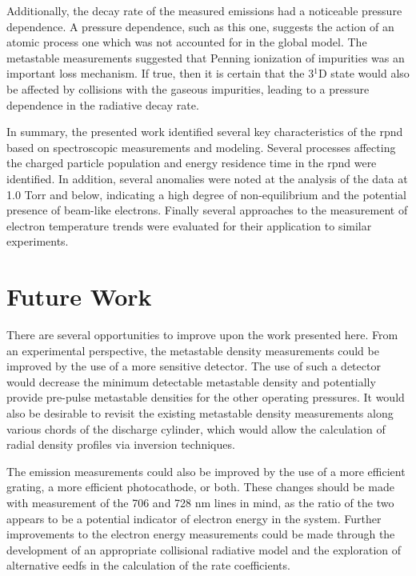 Additionally, the decay rate of the measured emissions had a noticeable pressure
dependence. A pressure dependence, such as this one, suggests the action of an
atomic process one which was not accounted for in the global model. The
metastable measurements suggested that Penning ionization of impurities was an
important loss mechanism. If true, then it is certain that the 3$^1$D state
would also be affected by collisions with the gaseous impurities, leading to a
pressure dependence in the radiative decay rate.

In summary, the presented work identified several key characteristics of the
\acs{rpnd} based on spectroscopic measurements and modeling. Several processes
affecting the charged particle population and energy residence time in the
\acs{rpnd} were identified. In addition, several anomalies were noted at the
analysis of the data at 1.0 Torr and below, indicating a high degree of
non-equilibrium and the potential presence of beam-like electrons. Finally
several approaches to the measurement of electron temperature trends were
evaluated for their application to similar experiments.

\section{Future Work}

There are several opportunities to improve upon the work presented here. From an
experimental perspective, the metastable density measurements could be improved
by the use of a more sensitive detector. The use of such a detector would
decrease the minimum detectable metastable density and potentially provide
pre-pulse metastable densities for the other operating pressures. It would also
be desirable to revisit the existing metastable density measurements along
various chords of the discharge cylinder, which would allow the calculation of
radial density profiles via inversion techniques.

The emission measurements could also be improved by the use of a more efficient
grating, a more efficient photocathode, or both. These changes should be made
with measurement of the 706 and 728 nm lines in mind, as the ratio of the two
appears to be a potential indicator of electron energy in the system. Further
improvements to the electron energy measurements could be made through the
development of an appropriate collisional radiative model and the exploration of
alternative \acs{eedf}s in the calculation of the rate coefficients.


